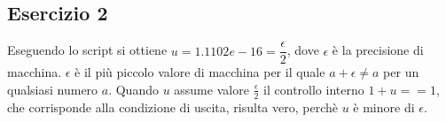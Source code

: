 \subsection{Esercizio 2}
Eseguendo lo script si ottiene $u = 1.1102e-16 = \dfrac{\epsilon}{2}$, dove $\epsilon$ è la precisione di macchina.
$\epsilon$ è il più piccolo valore di macchina per il quale $a + \epsilon \neq a$ per un qualsiasi numero $a$. Quando $u$ assume valore $\frac{\epsilon}{2}$ il controllo interno $1+u==1$, che corrisponde alla condizione di uscita, risulta vero, perchè $u$ è minore di $\epsilon$.
